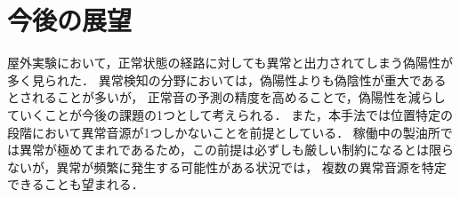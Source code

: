 \documentclass[../main]{subfiles}
\begin{document}
\section{今後の展望}
\label{sec:conc_future}
屋外実験において，正常状態の経路に対しても異常と出力されてしまう偽陽性が多く見られた．
異常検知の分野においては，偽陽性よりも偽陰性が重大であるとされることが多いが，
正常音の予測の精度を高めることで，偽陽性を減らしていくことが今後の課題の1つとして考えられる．
また，本手法では位置特定の段階において異常音源が1つしかないことを前提としている．
稼働中の製油所では異常が極めてまれであるため，この前提は必ずしも厳しい制約になるとは限らないが，異常が頻繁に発生する可能性がある状況では，
複数の異常音源を特定できることも望まれる．
\end{document}
